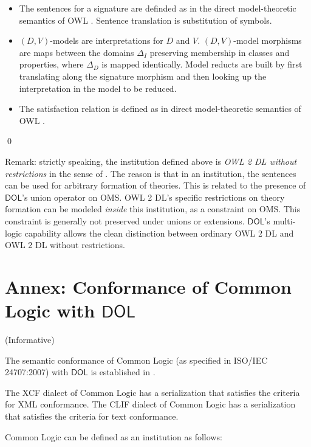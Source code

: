 \documentclass[10pt,fleqn,final]{scrreprt}
\newcommand*{\DOL}{\ensuremath{\mathsf{DOL}}\xspace}
\newcommand{\informative}[0]{{\begin{center}{\Large{(Informative})}\end{center}} \bigskip}
\newcommand{\nisref}[1]{#1}
\newcommand{\infannex}[1]{ \chapter{Annex: #1}  \informative }
\newenvironment{definitions}[0]{\medskip }{}
\begin{document}
\begin{definitions}
\begin{definition}
\begin{itemize}
\begin{itemize}
\end{itemize}
\item The sentences for a signature are definded as in
the direct model-theoretic semantics of OWL \cite{w3c:owl2-direct-semantics}. Sentence translation is substitution of symbols.
\item  $(D,V)$-models are interpretations for $D$ and $V$. 
$(D,V)$-model morphisms are maps between the domains $\Delta_I$ preserving membership in classes and properties, where $\Delta_D$ is mapped identically. Model reducts are built by first translating along the signature morphism and then
looking up the interpretation in the model to be reduced.  
\item The satisfaction relation is defined as in direct model-theoretic semantics of OWL \cite{w3c:owl2-direct-semantics}.
\end{itemize}
\qed\end{definition}





Remark: strictly speaking, the institution defined above is
\emph{{OWL} 2 DL without restrictions} in the sense of
\cite{DBLP:conf/owled/SchneiderRS13}. The reason is that in an
institution, the sentences can be used for arbitrary formation of
theories. This is related to the presence of \DOL's union operator on
OMS.  OWL 2 DL's specific restrictions on theory formation can be
modeled \emph{inside} this institution, as a constraint on OMS.  This
constraint is generally not preserved under unions or
extensions. \DOL's multi-logic capability allows the clean distinction
between ordinary OWL 2 DL and {OWL} 2 DL without restrictions.


\infannex{Conformance of Common Logic with \DOL}\label{a:cl}

The semantic conformance of Common Logic (as specified in \nisref{ISO/IEC 24707:2007}) with \DOL is established in \cite{OntoGraph}.

The XCF dialect of Common Logic has a serialization that satisfies the criteria for XML conformance.  The CLIF dialect of Common Logic has a serialization that satisfies the criteria for text conformance.

Common Logic can be defined as an institution as follows:


\end{definitions}
\end{document}
